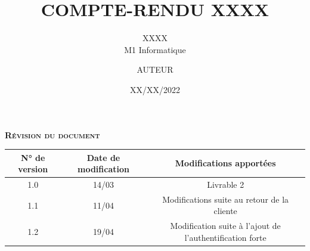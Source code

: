 \documentclass[oneside,12pt]{scrartcl}
\title{COMPTE-RENDU XXXX}
\subtitle{XXXX \\ M1 Informatique}
\author{AUTEUR}
\date{XX/XX/2022}
\begin{document}

\thispagestyle{empty} %

\newpage

\begin{center}
\textsc{\Large \textbf{Révision du document}}
\end{center}
\vspace{2cm}
\begin{center}
\begin{tabular}{|c|c|c|}
    \hline
  N° de version & Date de modification & Modifications apportées  \\
    \hline
    1.0 & 14/03 & Livrable 2 \\ \hline
    1.1 & 11/04 & Modifications suite au retour de la cliente\\ \hline
    1.2 & 19/04 & Modification suite à l'ajout de l'authentification forte\\
    \hline
\end{tabular}
\end{center}


\newpage
{} %
{
\renewcommand*\contentsname{Sommaire}
\tableofcontents
}

\clearpage



\newpage


\newpage


\newpage


\newpage


\newpage


\newpage

\end{document}
